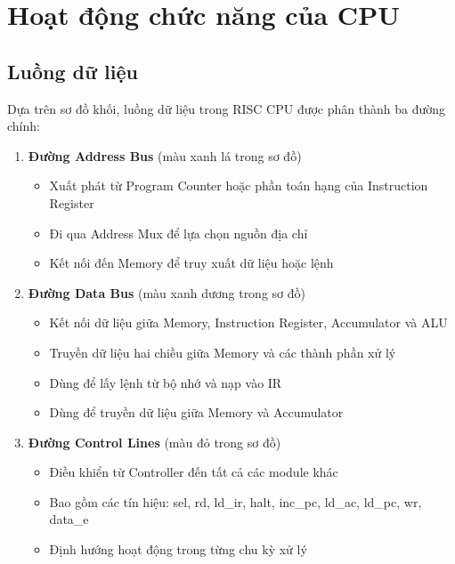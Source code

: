 \section{Hoạt động chức năng của CPU}

\subsection{Luồng dữ liệu}

Dựa trên sơ đồ khối, luồng dữ liệu trong RISC CPU được phân thành ba đường chính:

\begin{enumerate}
    \item \textbf{Đường Address Bus} (màu xanh lá trong sơ đồ)
    \begin{itemize}
        \item Xuất phát từ Program Counter hoặc phần toán hạng của Instruction Register
        \item Đi qua Address Mux để lựa chọn nguồn địa chỉ
        \item Kết nối đến Memory để truy xuất dữ liệu hoặc lệnh
    \end{itemize}

    \item \textbf{Đường Data Bus} (màu xanh dương trong sơ đồ)
    \begin{itemize}
        \item Kết nối dữ liệu giữa Memory, Instruction Register, Accumulator và ALU
        \item Truyền dữ liệu hai chiều giữa Memory và các thành phần xử lý
        \item Dùng để lấy lệnh từ bộ nhớ và nạp vào IR
        \item Dùng để truyền dữ liệu giữa Memory và Accumulator
    \end{itemize}
    
    \item \textbf{Đường Control Lines} (màu đỏ trong sơ đồ)
    \begin{itemize}
        \item Điều khiển từ Controller đến tất cả các module khác
        \item Bao gồm các tín hiệu: sel, rd, ld\_ir, halt, inc\_pc, ld\_ac, ld\_pc, wr, data\_e
        \item Định hướng hoạt động trong từng chu kỳ xử lý
    \end{itemize}
\end{enumerate}

